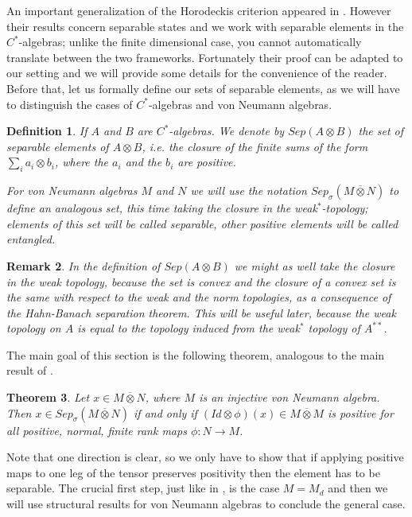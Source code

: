 \documentclass[11pt]{article}
\newtheorem{theorem}{Theorem}
\numberwithin{theorem}{section}
\newtheorem{definition}[theorem]{Definition}
\newtheorem{remark}[theorem]{Remark}
\begin{document}
An important generalization of the Horodeckis criterion appeared in \cite{MillerOlkiewicz}. However their results concern separable states and we work with separable elements in the $C^{\ast}$-algebras; unlike the finite dimensional case, you cannot automatically translate between the two frameworks. Fortunately their proof can be adapted to our setting and we will provide some details for the convenience of the reader. Before that, let us formally define our sets of separable elements, as we will have to distinguish the cases of $C^{\ast}$-algebras and von Neumann algebras.
\begin{definition} 
If $A$ and $B$ are $C^{\ast}$-algebras. We denote by $Sep(A\otimes B)$ the set of separable elements of $A\otimes B$, i.e. the closure of the finite sums of the form $\sum_{i} a_{i} \otimes b_{i}$, where the $a_{i}$ and the $b_{i}$ are positive. 

For von Neumann algebras $M$ and $N$ we will use the notation $Sep_{\sigma}(M\overline{\otimes} N)$ to define an analogous set, this time taking the closure in the weak$^{\ast}$-topology; elements of this set will be called separable, other positive elements will be called entangled. 
\end{definition}
\begin{remark}
In the definition of $Sep(A\otimes B)$ we might as well take the closure in the weak topology, because the set is convex and the closure of a convex set is the same with respect to the weak and the norm topologies, as a consequence of the Hahn-Banach separation theorem. This will be useful later, because the weak topology on $A$ is equal to the topology induced from the weak$^{\ast}$ topology of $A^{\ast\ast}$.
\end{remark}
The main goal of this section is the following theorem, analogous to the main result of \cite{MillerOlkiewicz}.
\begin{theorem}\label{thm:Horodecki}
Let $x \in M\overline{\otimes} N$, where $M$ is an injective von Neumann algebra. Then $x\in Sep_{\sigma}(M\overline{\otimes} N)$ if and only if $(Id\otimes \phi)(x) \in M\overline{\otimes} M$ is positive for all positive, normal, finite rank maps $\phi: N \to M$.
\end{theorem}
Note that one direction is clear, so we only have to show that if applying positive maps to one leg of the tensor preserves positivity then the element has to be separable. The crucial first step, just like in \cite{MillerOlkiewicz}, is the case $M=M_d$ and then we will use structural results for von Neumann algebras to conclude the general case.
\end{document}
